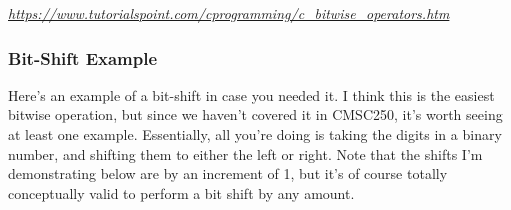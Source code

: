 \documentclass[english, 10pt]{article}
\begin{document}
{
\textit{
\href{https://www.tutorialspoint.com/cprogramming/c\_bitwise\_operators.htm}{https://www.tutorialspoint.com/cprogramming/c\_bitwise\_operators.htm}
}
}


\subsubsection{Bit-Shift Example}

Here's an example of a bit-shift in case you needed it. I think this is the easiest bitwise operation, but since we haven't covered it in CMSC250, it's worth seeing at least one example. Essentially, all you're doing is taking the digits in a binary number, and shifting them to either the left or right. Note that the shifts I'm demonstrating below are by an increment of 1, but it's of course totally conceptually valid to perform a bit shift by any amount.
\end{document}
